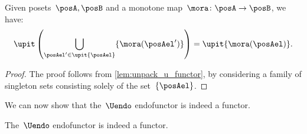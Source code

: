 \begin{lemma}
  \label{lem:unpack_part_2}
  Given posets~$\posA,\posB$ and a monotone map~$\mora\colon \posA\to \posB$, we have:
  \begin{equation}
    \upit \left( \bigcup_{\posAel'\in \upit \{\posAel\}} \{\mora(\posAel')\}\right)=\upit \{\mora(\posAel)\}.
  \end{equation}
\end{lemma}
\begin{proof}
  The proof follows from \cref{lem:unpack_u_functor}, by considering a family of singleton sets consisting solely of the set~$\{\posAel\}$.
\end{proof}
We can now show that the~$\Uendo$ endofunctor is indeed a functor.

\begin{lemma}
  The~$\Uendo$ endofunctor is indeed a functor.
\end{lemma}


